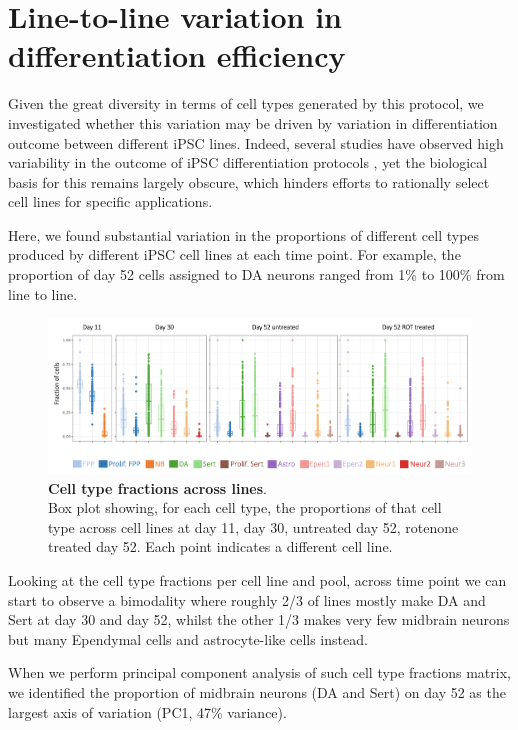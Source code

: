 \newpage

\section{Line-to-line variation in differentiation efficiency}

Given the great diversity in terms of cell types generated by this protocol, we investigated whether this variation may be driven by variation in differentiation outcome between different iPSC lines. 
Indeed, several studies have observed high variability in the outcome of iPSC differentiation protocols \cite{d2019association, volpato2018reproducibility}, yet the biological basis for this remains largely obscure, which hinders efforts to rationally select cell lines for specific applications. 

Here, we found substantial variation in the proportions of different cell types produced by different iPSC cell lines at each time point. 
For example, the proportion of day 52 cells assigned to DA neurons ranged from 1\% to 100\% from line to line. 

\begin{figure}[h]
\centering
\includegraphics[width=15cm]{Chapter5/Fig/neuroseq_line_celltype.png}
\caption[Cell type fractions across lines]{\textbf{Cell type fractions across lines}.\\
Box plot showing, for each cell type, the proportions of that cell type across cell lines at day 11, day 30, untreated day 52, rotenone treated day 52. 
Each point indicates a different cell line.}
\label{fig:neuroseq_line_variation}
\end{figure}

Looking at the cell type fractions per cell line and pool, across time point we can start to observe a bimodality where roughly 2/3 of lines mostly make DA and Sert at day 30 and day 52, whilst the other 1/3 makes very few midbrain neurons but many Ependymal cells and astrocyte-like cells instead.

When we perform principal component analysis of such cell type fractions matrix, we identified the proportion of midbrain neurons (DA and Sert) on day 52 as the largest axis of variation (PC1, 47\% variance). 

